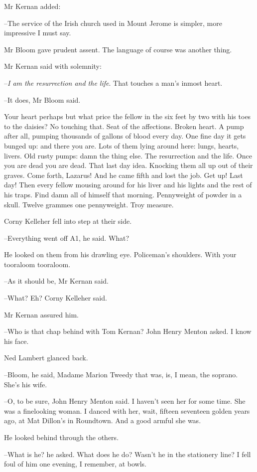 Mr Kernan added:

--The service of the Irish church used in Mount Jerome is simpler,
more impressive I must say.

Mr Bloom gave prudent assent.
The language of course was another thing.

Mr Kernan said with solemnity:

--\emph{I am the resurrection and the life}.
That touches a man's inmost heart.

--It does,
Mr Bloom said.

Your heart perhaps but what price the fellow
in the six feet by two
with his toes to the daisies?
No touching that.
Seat of the affections.
Broken heart.
A pump after all, pumping thousands of gallons of blood every day.
One fine day it gets bunged up:
and there you are.
Lots of them lying around here:
lungs, hearts, livers.
Old rusty pumps:
damn the thing else.
The resurrection and the life.
Once you are dead you are dead.
That last day idea.
Knocking them all up out of their graves.
Come forth, Lazarus!
And he came fifth and lost the job.
Get up!
Last day!
Then every fellow mousing around for his liver and his lights
and the rest of his traps.
Find damn all of himself that morning.
Pennyweight of powder in a skull.
Twelve grammes one pennyweight.
Troy measure.

Corny Kelleher fell into step at their side.

--Everything went off A1,
he said.
What?

He looked on them from his drawling eye.
Policeman's shoulders.
With your tooraloom tooraloom.

--As it should be,
Mr Kernan said.

--What?
Eh?
Corny Kelleher said.

Mr Kernan assured him.

--Who is that chap behind with Tom Kernan?
John Henry Menton asked.
I know his face.

Ned Lambert glanced back.

--Bloom,
he said,
Madame Marion Tweedy that was,
is, I mean,
the soprano.
She's his wife.

--O, to be sure,
John Henry Menton said.
I haven't seen her for some time.
She was a finelooking woman.
I danced with her, wait, fifteen seventeen golden years ago,
at Mat Dillon's in Roundtown.
And a good armful she was.

He looked behind through the others.

--What is he?
he asked.
What does he do?
Wasn't he in the stationery line?
I fell foul of him one evening, I remember, at bowls.

